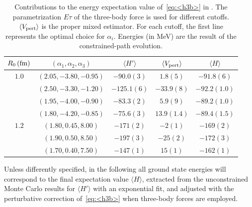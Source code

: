 \documentclass[aps,prc,twocolumn,superscriptaddress,floatfix]{revtex4-1}
\begin{document}
\setlength{\tabcolsep}{1.5pt}
\begin{table}[htb]
\centering
\caption[]{Contributions to the energy expectation value of~\cref{eq:<h3b>} in .
The parametrization $E\tau$ of the three-body force is used for different cutoffs.
$\langle V_{\rm pert}\rangle$ is the proper mixed estimator. 
For each cutoff, the first line represents the optimal choice for $\alpha_i$.
Energies (in MeV) are the result of the constrained-path evolution.}
\begin{tabular}{ccccc}
\hline\hline
$R_0\,(\rm fm)$ & $(\alpha_1,\alpha_2,\alpha_3)$ & $\langle H'\rangle$ & $\langle V_{\rm pert}\rangle$ & $\langle H\rangle$ \\
\hline
$1.0$ & $(2.05,-3.80,-0.95)$ & $-90.0(3)$  & $1.8(5)$    & $-91.8(6)$   \\
      & $(2.50,-3.30,-1.20)$ & $-125.1(6)$ & $-33.9(8)$  & $-92.2(1.0)$ \\
      & $(1.95,-4.00,-0.90)$ & $-83.3(2)$  & $5.9(9)$    & $-89.2(1.0)$ \\
      & $(1.80,-4.20,-0.85)$ & $-75.6(3)$  & $13.9(1.4)$ & $-89.4(1.5)$ \\
\hline                        
$1.2$ & $(1.80,0.45,8.00)$   & $-171(2)$   & $-2(1)$     & $-169(2)$    \\
      & $(1.90,0.50,8.50)$   & $-197(3)$   & $-25(2)$    & $-172(3)$    \\
      & $(1.70,0.40,7.50)$   & $-147(1)$   & $15(1)$     & $-162(1)$    \\
\hline\hline
\end{tabular}
\label{tab:alpha}
\end{table}
\setlength{\tabcolsep}{10pt}

Unless differently specified, in the following all ground state energies will 
correspond to the final expectation value $\langle H\rangle$, extracted from 
the unconstrained Monte Carlo results for $\langle H'\rangle$ with an exponential fit, 
and adjusted with the perturbative correction of~\cref{eq:<h3b>} when three-body forces are employed.
\end{document}
